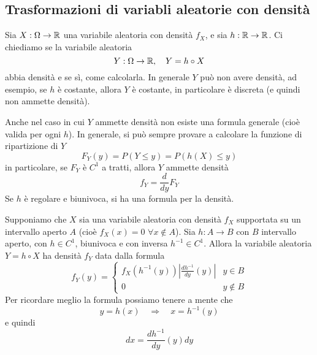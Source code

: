 \subsection{Trasformazioni di variabli aleatorie con densità}
Sia $X : \Omega \to \mathbb{R}$ una variabile aleatoria con densità $f_X$, e sia $h : \mathbb{R} \to \mathbb{R}$. Ci
chiediamo se la variabile aleatoria
\[ Y : \Omega \to \mathbb{R}, \quad Y = h \circ X \]
abbia densità e se sì, come calcolarla. In generale $Y$ può non avere densità, ad esempio, se $h$
è costante, allora $Y$ è costante, in particolare è discreta (e quindi non ammette densità).

Anche nel caso in cui $Y$ ammette densità non esiste una formula generale (cioè valida per ogni
$h$). In generale, si può sempre provare a calcolare la funzione di ripartizione di $Y$
\[ F_Y (y) = P(Y \leq y) = P(h(X) \leq y) \]
in particolare, se $F_Y$ è $C^1$ a tratti, allora $Y$ ammette densità
\[ f_Y = \frac{d}{dy} F_Y \]
Se $h$ è regolare e biunivoca, si ha una formula per la densità.

\begin{proposition}
	Supponiamo che $X$ sia una variabile aleatoria con densità $f_X$ supportata su un intervallo
	aperto $A$ (cioè $f_X(x) = 0$ $\forall x \notin A$). Sia $h : A \to B$ con $B$ intervallo
	aperto, con $h \in C^1$, biunivoca e con inversa $h^{-1} \in C^1$. Allora la variabile
	aleatoria $Y = h \circ X$ ha densità $f_Y$ data dalla formula
	\[
		f_Y(y) = \begin{cases}
			f_X (h^{-1} (y)) \left| \frac{d h^{-1}}{dy} (y) \right| & y \in B    \\[2ex]
			0                                                       & y \notin B
		\end{cases}
	\]
	Per ricordare meglio la formula possiamo tenere a mente che
	\[ y = h(x) \quad \Rightarrow \quad x = h^{-1}(y) \]
	e quindi
	\[ dx = \frac{d h^{-1}}{dy} (y) dy \]
\end{proposition}

